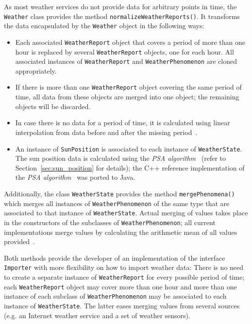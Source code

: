As most weather services do not provide data for arbitrary points in time, the \texttt{Weather} class provides the method \texttt{normalizeWeatherReports()}. It transforms the data encapsulated by the \texttt{Weather} object in the following ways:
\begin{itemize}
  \item Each associated \texttt{WeatherReport} object that covers a period of more than one hour is replaced by several \texttt{WeatherReport} objects, one for each hour. All associated instances of \texttt{WeatherReport} and \texttt{WeatherPhenomenon} are cloned appropriately.
  
  \item If there is more than one \texttt{WeatherReport} object covering the same period of time, all data from these objects are merged into one object; the remaining objects will be discarded.
  
  \item In case there is no data for a period of time, it is calculated using linear interpolation from data before and after the missing period~\cite{maths}.
  
  \item An instance of \texttt{SunPosition} is associated to each instance of \texttt{WeatherState}. The sun position data is calculated using the \emph{PSA algorithm}~\cite{PSA_algorithm} (refer to Section~\ref{sec:sun_position} for details); the C++ reference implementation of the \emph{PSA algorithm}~\cite{psa_online} was ported to Java.
\end{itemize}

Additionally, the class \texttt{WeatherState} provides the method \texttt{mergePhenomena()} which merges all instances of \texttt{WeatherPhenomenon} of the same type that are associated to that instance of \texttt{WeatherState}. Actual merging of values takes place in the constructors of the subclasses of \texttt{WeatherPhenomenon}; all current implementations merge values by calculating the arithmetic mean of all values provided~\cite{maths}.

Both methods provide the developer of an implementation of the interface \texttt{Importer} with more flexibility on how to import weather data: There is no need to create a separate instance of \texttt{WeatherReport} for every possible period of time; each \texttt{WeatherReport} object may cover more than one hour and more than one instance of each subclass of \texttt{WeatherPhenomenon} may be associated to each instance of \texttt{WeatherState}. The latter eases merging values from several sources (e.g. an Internet weather service and a set of weather sensors).

